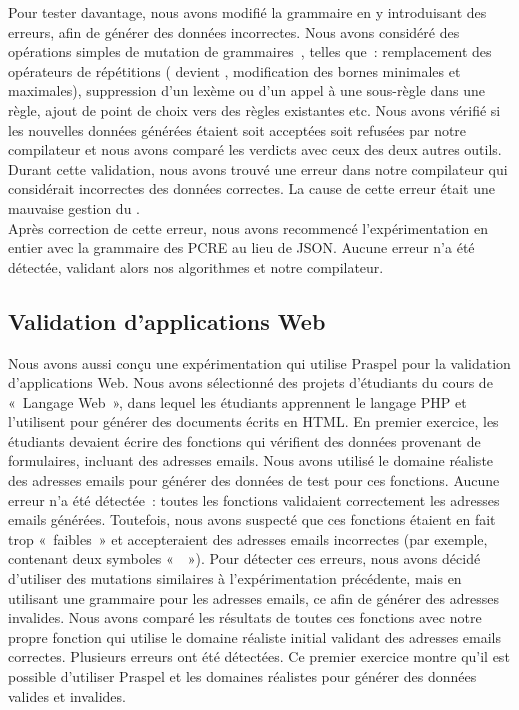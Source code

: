 Pour tester davantage, nous avons modifié la grammaire en y introduisant des
erreurs, afin de générer des données incorrectes. Nous avons considéré des
opérations simples de mutation de grammaires~, telles que~:
remplacement des opérateurs de répétitions (\code{+} devient \code{*},
modification des bornes minimales et maximales), suppression d'un lexème ou d'un
appel à une sous-règle dans une règle, ajout de point de choix vers des règles
existantes etc. Nous avons vérifié si les nouvelles données générées étaient
soit acceptées soit refusées par notre compilateur et nous avons comparé les
verdicts avec ceux des deux autres outils. Durant cette validation, nous avons
trouvé une erreur dans notre compilateur qui considérait incorrectes des données
correctes. La cause de cette erreur était une mauvaise gestion du
. \\

Après correction de cette erreur, nous avons recommencé l'expérimentation en
entier avec la grammaire des PCRE au lieu de JSON. Aucune erreur n'a été
détectée, validant alors nos algorithmes et notre compilateur.

\subsection{Validation d'applications Web}

Nous avons aussi conçu une expérimentation qui utilise Praspel pour la
validation d'applications Web. Nous avons sélectionné des projets d'étudiants du
cours de «~Langage Web~», dans lequel les étudiants apprennent le langage PHP et
l'utilisent pour générer des documents écrits en HTML. En premier exercice, les
étudiants devaient écrire des fonctions qui vérifient des données provenant de
formulaires, incluant des adresses emails. Nous avons utilisé le domaine
réaliste des adresses emails pour générer des données de test pour ces
fonctions. Aucune erreur n'a été détectée~: toutes les fonctions validaient
correctement les adresses emails générées. Toutefois, nous avons suspecté que
ces fonctions étaient en fait trop «~faibles~» et accepteraient des adresses
emails incorrectes (par exemple, contenant deux symboles «~~»). Pour
détecter ces erreurs, nous avons décidé d'utiliser des mutations similaires à
l'expérimentation précédente, mais en utilisant une grammaire pour les adresses
emails, ce afin de générer des adresses invalides. Nous avons comparé les
résultats de toutes ces fonctions avec notre propre fonction qui utilise le
domaine réaliste initial validant des adresses emails correctes. Plusieurs
erreurs ont été détectées. Ce premier exercice montre qu'il est possible
d'utiliser Praspel et les domaines réalistes pour générer des données valides et
invalides.

